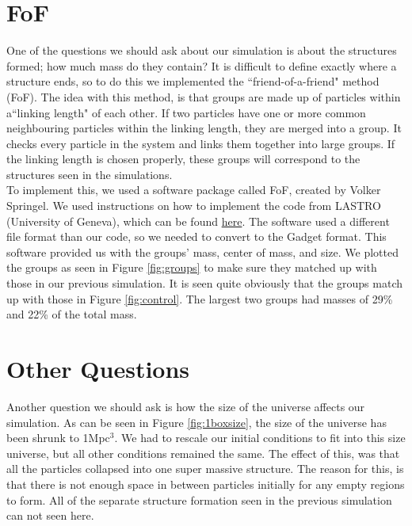\documentclass[10pt]{article}
\begin{document}
	
	
\section{FoF}
	One of the questions we should ask about our simulation is about the structures formed; how much mass do they contain? It is difficult to define exactly where a structure ends, so to do this we implemented the ``friend-of-a-friend" method (FoF). The idea with this method, is that groups are made up of particles within a``linking length" of each other. If two particles have one or more common neighbouring particles within the linking length, they are merged into a group. It checks every particle in the system and links them together into large groups. If the linking length is chosen properly, these groups will correspond to the structures seen in the simulations.\\
	To implement this, we used a software package called FoF, created by Volker Springel. We used instructions on how to implement the code from LASTRO (University of Geneva), which can be found \href{http://obswww.unige.ch/lastro/misc/TP4/doc/rst/Exercices/Ex05.html#extracting-haloes}{here}. The software used a different file format than our code, so we needed to convert to the Gadget format. This software provided us with the groups' mass, center of mass, and size. We plotted the groups as seen in Figure \ref{fig:groups}{} to make sure they matched up with those in our previous simulation. It is seen quite obviously that the groups match up with those in Figure \ref{fig:control}. The largest two groups had masses of 29\% and 22\% of the total mass.


\section{Other Questions}
	Another question we should ask is how the size of the universe affects our simulation. As can be seen in Figure \ref{fig:1boxsize}{}, the size of the universe has been shrunk to 1Mpc$^3$. We had to rescale our initial conditions to fit into this size universe, but all other conditions remained the same. The effect of this, was that all the particles collapsed into one super massive structure. The reason for this, is that there is not enough space in between particles initially for any empty regions to form. All of the separate structure formation seen in the previous simulation can not seen here.\\
\end{document}
